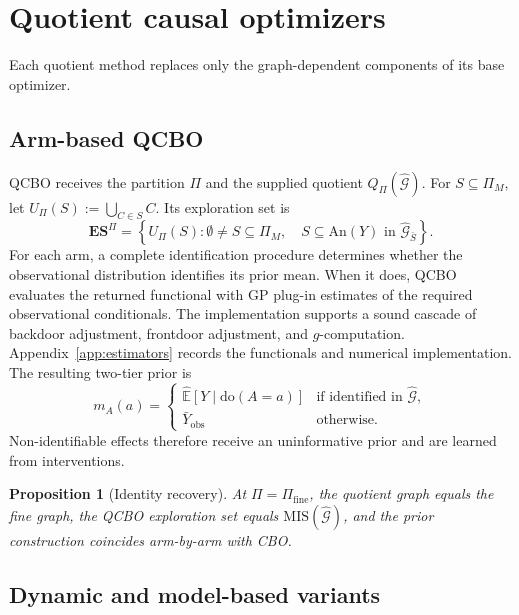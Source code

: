 \documentclass[twoside]{article}
\newtheorem{proposition}{Proposition}
\newcommand{\E}{\mathbb{E}}
\newcommand{\doo}{\mathrm{do}}
\newcommand{\An}{\mathrm{An}}
\newcommand{\Gg}{\mathcal{G}}
\newcommand{\ESpi}{\mathbf{ES}^{\Pi}}
\begin{document}
\section{Quotient causal optimizers}
\label{sec:methods}

Each quotient method replaces only the graph-dependent components of its base optimizer.

\subsection{Arm-based QCBO}

QCBO receives the partition \(\Pi\) and the supplied quotient \(Q_\Pi(\widehat{\Gg})\). For $S\subseteq\Pi_M$, let $U_\Pi(S):=\bigcup_{C\in S}C$. Its exploration set is
\begin{equation}
 \ESpi=\left\{U_\Pi(S):
 \emptyset\ne S\subseteq\Pi_M,\quad
 S\subseteq\An(Y)\text{ in }\widehat{\mathcal G}_{\bar S}\right\}.
 \label{eq:qcbo-arms}
\end{equation}
For each arm, a complete identification procedure determines whether the observational distribution identifies its prior mean. When it does, QCBO evaluates the returned functional with GP plug-in estimates of the required observational conditionals. The implementation supports a sound cascade of backdoor adjustment, frontdoor adjustment, and $g$-computation. Appendix~\ref{app:estimators} records the functionals and numerical implementation. The resulting two-tier prior is
\begin{equation}
  m_A(a)=
  \begin{cases}
    \widehat{\E}[Y\mid\doo(A=a)] & \text{if identified in }\widehat{\mathcal G},\\
    \bar Y_{\mathrm{obs}} & \text{otherwise.}
  \end{cases}
  \label{eq:two-tier-prior}
\end{equation}
Non-identifiable effects therefore receive an uninformative prior and are
learned from interventions.

\begin{proposition}[Identity recovery]
\label{prop:identity}
At $\Pi=\Pi_{\mathrm{fine}}$, the quotient graph equals the fine graph, the QCBO
exploration set equals $\mathrm{MIS}(\widehat{\Gg})$, and the prior construction
coincides arm-by-arm with CBO.
\end{proposition}

\subsection{Dynamic and model-based variants}
\end{document}
